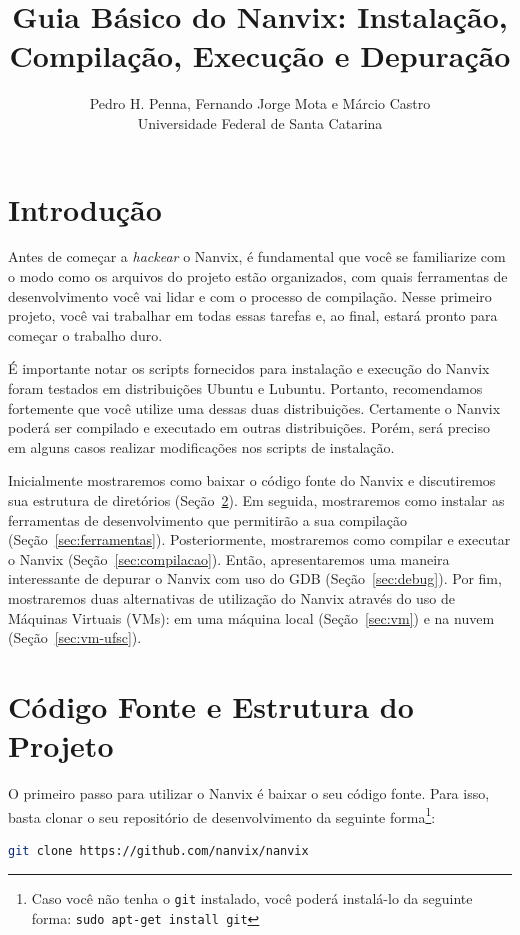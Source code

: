 \documentclass[11pt]{article}
\title{Guia Básico do Nanvix: Instalação, Compilação, Execução e Depuração}
\author{Pedro H. Penna, Fernando Jorge Mota e Márcio Castro\\[0.3em]
\small Universidade Federal de Santa Catarina}
\date{}
\begin{document}
\maketitle

\section{Introdução}

Antes de começar a \textit{hackear} o Nanvix, é fundamental que você se familiarize com o modo como os arquivos do projeto estão organizados, com quais ferramentas de desenvolvimento você vai lidar e com o processo de compilação. Nesse primeiro projeto, você vai trabalhar em todas essas tarefas e, ao final, estará pronto para começar o trabalho duro.

É importante notar os scripts fornecidos para instalação e execução do Nanvix foram testados em distribuições Ubuntu e Lubuntu. Portanto, recomendamos fortemente que você utilize uma dessas duas distribuições. Certamente o Nanvix poderá ser compilado e executado em outras distribuições. Porém, será preciso em alguns casos realizar modificações nos scripts de instalação. 

Inicialmente mostraremos como baixar o código fonte do Nanvix e discutiremos sua estrutura de diretórios (Seção~\ref{sec:codigo}). Em seguida, mostraremos como instalar as ferramentas de desenvolvimento que permitirão a sua compilação (Seção~\ref{sec:ferramentas}). Posteriormente, mostraremos como compilar e executar o Nanvix (Seção~\ref{sec:compilacao}). Então, apresentaremos uma maneira interessante de depurar o Nanvix com uso do GDB (Seção~\ref{sec:debug}). Por fim, mostraremos duas alternativas de utilização do Nanvix através do uso de Máquinas Virtuais (VMs): em uma máquina local (Seção~\ref{sec:vm}) e na nuvem (Seção~\ref{sec:vm-ufsc}).

\section{Código Fonte e Estrutura do Projeto}
\label{sec:codigo}
O primeiro passo para utilizar o Nanvix é baixar o seu código fonte. Para isso, basta clonar o seu repositório de desenvolvimento da seguinte forma\footnote{Caso você não tenha o \texttt{git} instalado, você poderá instalá-lo da seguinte forma: \texttt{sudo apt-get install git}}:\\

\begin{lstlisting}[language=bash,numbers=none,frame=single]
git clone https://github.com/nanvix/nanvix
\end{lstlisting}
\end{document}
